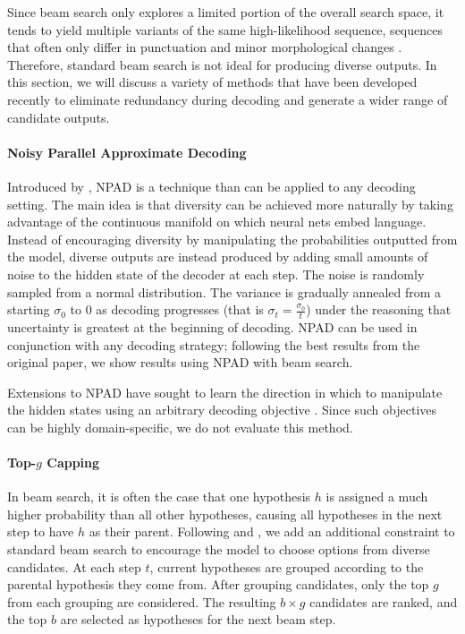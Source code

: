 Since beam search only explores a limited portion of the overall search space, it tends to yield multiple variants of the same high-likelihood sequence, sequences that often only differ in punctuation and minor morphological changes \cite{li2016mutual}.  
Therefore, standard beam search is not ideal for producing diverse outputs.
In this section, we will discuss a variety of methods that have been developed recently to eliminate redundancy during decoding and generate a wider range of candidate outputs.

\paragraph{Noisy Parallel Approximate Decoding}\quad
Introduced by \citet{cho2016noisy}, NPAD is a technique than can be applied to any decoding setting.
The main idea is that diversity can be achieved more naturally by taking advantage of the continuous manifold on which neural nets embed language.
Instead of encouraging diversity by manipulating the probabilities outputted from the model, diverse outputs are instead produced by adding small amounts of noise to the hidden state of the decoder at each step.
The noise is randomly sampled from a normal distribution. The variance is gradually annealed from a starting $\sigma_0$ to 0 as decoding progresses (that is $\sigma_t = \frac{\sigma_0}{t}$) under the reasoning that uncertainty is greatest at the beginning of decoding.
NPAD can be used in conjunction with any decoding strategy; following the best results from the original paper, we show results using NPAD with beam search.

Extensions to NPAD have sought to learn the direction in which to manipulate the hidden states using an arbitrary decoding objective \cite{gu2017trainable}.
Since such objectives can be highly domain-specific, we do not evaluate this method.

\paragraph{Top-$g$ Capping}\quad
In beam search, it is often the case that one hypothesis $h$ is assigned a much higher probability than all other hypotheses, causing all hypotheses in the next step to have $h$ as their parent. Following \citet{li2016mutual} and \citet{li2016simple}, we add an additional constraint to standard beam search to encourage the model to choose options from diverse candidates.
At each step $t$, current hypotheses are grouped according to the parental hypothesis they come from.
After grouping candidates, only the top $g$ from each grouping are considered. The resulting $b \times g$ candidates are ranked, and the top $b$ are selected as hypotheses for the next beam step.

